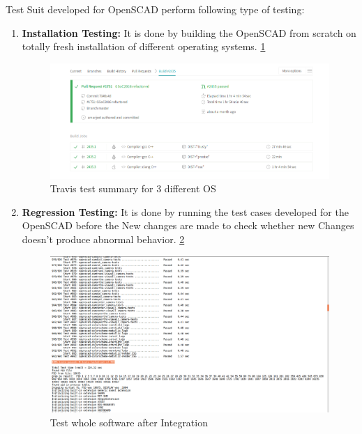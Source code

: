 Test Suit developed for OpenSCAD perform following type of testing:
 
 \begin{enumerate}
     \item \textbf{Installation Testing:} It is done by building the OpenSCAD from scratch on totally fresh installation of different operating systems. \ref{fig:travis}
   
     \begin{figure}[H]
         \centering
         \includegraphics[width=\linewidth]{images/travis}
         \caption{Travis test summary for 3 different OS }
         \label{fig:travis}
     \end{figure}
   
     \item \textbf{Regression Testing:} It is done by running the test cases developed for the OpenSCAD before the New changes are made to check whether new Changes doesn't produce abnormal behavior. \ref{fig:generalTest}
   
     \begin{figure}[H]
         \centering
         \includegraphics[width=\linewidth]{images/generalTest}
         \caption{Test whole software after Integration}
         \label{fig:generalTest}
     \end{figure}
   

\end{enumerate}
